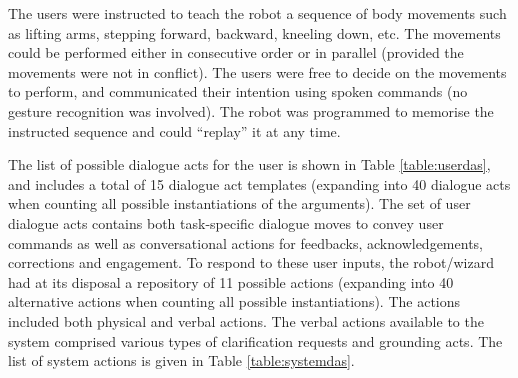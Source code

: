 The users were instructed to teach the robot a sequence of body movements such as lifting arms, stepping forward, backward, kneeling down, etc.  The movements could be performed either in consecutive order or in parallel (provided the movements were not in conflict).  The users were free to decide on the movements to perform, and communicated their intention using spoken commands (no gesture recognition was involved).  The robot was programmed to memorise the instructed sequence and could ``replay'' it at any time.

The list of possible dialogue acts for the user is shown in Table \ref{table:userdas}, and includes a total of 15 dialogue act templates (expanding into 40 dialogue acts when counting all possible  instantiations of the arguments). The set of user dialogue acts contains both task-specific dialogue moves to convey user commands as well as conversational actions for feedbacks, acknowledgements, corrections and engagement.  To respond to these user inputs, the robot/wizard had at its disposal a repository of 11 possible actions (expanding into 40 alternative actions when counting all possible instantiations).  The actions included both physical and verbal actions. The verbal actions available to the system comprised various types of clarification requests and grounding acts. The list of system actions is given in Table \ref{table:systemdas}. 

\renewcommand{\arraystretch}{1.3}

